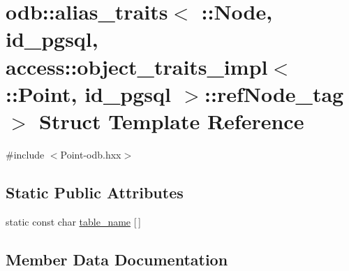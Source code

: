 \hypertarget{structodb_1_1alias__traits_3_01_1_1_node_00_01id__pgsql_00_01access_1_1object__traits__impl_3_013274b82f95462fed7f5ef459567458b6}{}\section{odb\+:\+:alias\+\_\+traits$<$ \+:\+:Node, id\+\_\+pgsql, access\+:\+:object\+\_\+traits\+\_\+impl$<$ \+:\+:Point, id\+\_\+pgsql $>$\+:\+:ref\+Node\+\_\+tag $>$ Struct Template Reference}
\label{structodb_1_1alias__traits_3_01_1_1_node_00_01id__pgsql_00_01access_1_1object__traits__impl_3_013274b82f95462fed7f5ef459567458b6}


{\ttfamily \#include $<$Point-\/odb.\+hxx$>$}

\subsection*{Static Public Attributes}
\begin{DoxyCompactItemize}
\item 
static const char \hyperlink{structodb_1_1alias__traits_3_01_1_1_node_00_01id__pgsql_00_01access_1_1object__traits__impl_3_013274b82f95462fed7f5ef459567458b6_a6b4bc63fd277f8a6be635ac272030a8b}{table\+\_\+name} \mbox{[}$\,$\mbox{]}
\end{DoxyCompactItemize}


\subsection{Member Data Documentation}
\hypertarget{structodb_1_1alias__traits_3_01_1_1_node_00_01id__pgsql_00_01access_1_1object__traits__impl_3_013274b82f95462fed7f5ef459567458b6_a6b4bc63fd277f8a6be635ac272030a8b}{}
